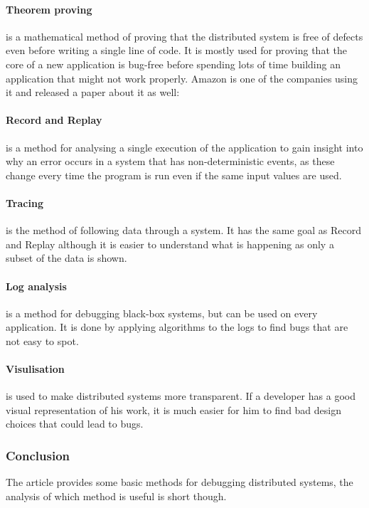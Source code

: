 \paragraph{Theorem proving} is a mathematical method of proving that the distributed system is free of defects even before writing a single line of code. It is mostly used for proving that the core of a new application is bug-free before spending lots of time building an application that might not work properly. Amazon is one of the companies using it and released a paper about it as well: \cite{Newcombe:2015:AWS:2749359.2699417}

\paragraph{Record and Replay} is a method for analysing a single execution of the application to gain insight into why an error occurs in a system that has non-deterministic events, as these change every time the program is run even if the same input values are used.

\paragraph{Tracing} is the method of following data through a system. It has the same goal as Record and Replay although it is easier to understand what is happening as only a subset of the data is shown.

\paragraph{Log analysis} is a method for debugging black-box systems, but can be used on every application. It is done by applying algorithms to the logs to find bugs that are not easy to spot.

\paragraph{Visulisation} is used to make distributed systems more transparent. If a developer has a good visual representation of his work, it is much easier for him to find bad design choices that could lead to bugs.

\subsubsection{Conclusion}
The article provides some basic methods for debugging distributed systems, the analysis of which method is useful is short though.
